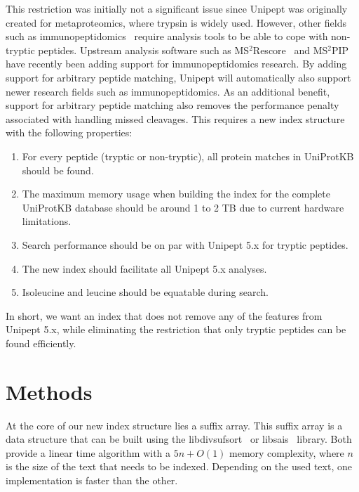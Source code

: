\documentclass[11pt]{article}
\begin{document}
\begin{multicols}{2}
        This restriction was initially not a significant issue since Unipept was originally created for metaproteomics, where trypsin is widely used.
        However, other fields such as immunopeptidomics~\cite{immunopeptidomics} require analysis tools to be able to cope with non-tryptic peptides.
        Upstream analysis software such as MS$^2$Rescore~\cite{ms2rescore} and MS$^2$PIP~\cite{ms2pip} have recently been adding support for immunopeptidomics research.
        By adding support for arbitrary peptide matching, Unipept will automatically also support newer research fields such as immunopeptidomics.
        As an additional benefit, support for arbitrary peptide matching also removes the performance penalty associated with handling missed cleavages.
        This requires a new index structure with the following properties:
        \begin{enumerate}
            \item For every peptide (tryptic or non-tryptic), all protein matches in UniProtKB should be found.
            \item The maximum memory usage when building the index for the complete UniProtKB database should be around 1 to 2 TB due to current hardware limitations.
            \item Search performance should be on par with Unipept 5.x for tryptic peptides.
            \item The new index should facilitate all Unipept 5.x analyses.
            \item Isoleucine and leucine should be equatable during search.
        \end{enumerate}
        In short, we want an index that does not remove any of the features from Unipept 5.x, while eliminating the restriction that only tryptic peptides can be found efficiently.


        \section{Methods}\label{sec:methods}
        At the core of our new index structure lies a suffix array.
        This suffix array is a data structure that can be built using the libdivsufsort~\cite{libdivsufsort} or libsais~\cite{libsais} library.
        Both provide a linear time algorithm with a $5n + O(1)$ memory complexity, where $n$ is the size of the text that needs to be indexed.
        Depending on the used text, one implementation is faster than the other.


\end{multicols}
\end{document}
